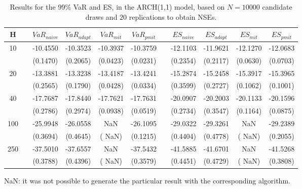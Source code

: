 \begin{table}[h] 
\centering 
\caption{Results for the $99\%$ VaR and ES, in the ARCH(1,1) model, based on $N=10000$ candidate draws and $20$ replications to obtain NSEs.} 
\label{tab:res_algos_arch} 
\begin{tabular}{ccccccccccc}  
 H & & $VaR_{naive}$ & $VaR_{adapt}$ & $VaR_{mit}$  & $VaR_{pmit}$ &  & $ES_{naive}$ & $ES_{adapt}$ & $ES_{mit}$ & $ES_{pmit}$ \\ \hline 
10 & & -10.4550 & -10.3523 & -10.3937 & -10.3759 & & -12.1103 & -11.9621 & -12.1270 & -12.0683  \\ 
 & & (0.1470) & (0.2065) & (0.0423) & (0.0231) & & (0.2354) & (0.2117) & (0.0630) & (0.0703)   \\ [1ex] 
20 & & -13.3881 & -13.3238 & -13.4187 & -13.4241 & & -15.2874 & -15.2458 & -15.3917 & -15.3965  \\ 
 & & (0.2565) & (0.1790) & (0.0428) & (0.0334) & & (0.3599) & (0.2727) & (0.1062) & (0.1001)   \\ [1ex] 
40 & & -17.7687 & -17.8440 & -17.7621 & -17.7631 & & -20.0907 & -20.2003 & -20.1133 & -20.1596  \\ 
 & & (0.2786) & (0.2974) & (0.0938) & (0.0519) & & (0.2734) & (0.3547) & (0.1164) & (0.0875)   \\ [1ex] 
100 & & -25.9948 & -26.0558 &    NaN & -26.1095 & & -29.0322 & -29.3261 &    NaN & -29.2389  \\ 
 & & (0.3694) & (0.4645) & (   NaN) & (0.1215) & & (0.4404) & (0.4778) & (   NaN) & (0.2055)   \\ [1ex] 
250 & & -37.5010 & -37.6557 &    NaN & -37.5432 & & -41.5885 & -41.6701 &    NaN & -41.5268  \\ 
 & & (0.3788) & (0.4396) & (   NaN) & (0.3579) & & (0.4451) & (0.4729) & (   NaN) & (0.3808)   \\ [1ex] 
\hline 
\end{tabular} 
\raggedright 

\vspace{5pt}\footnotesize{NaN: it was not possible to generate the particular result with the corresponding algorithm.} 
\end{table} 
